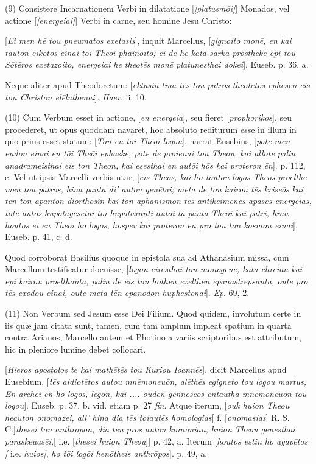 (9)
Consistere Incarnationem Verbi in dilatatione [\emph{[platusm\={o}i]}]
Monados, vel actione [\emph{[energeiai]}] Verbi in carne, seu homine
Jesu Christo:

[\emph{Ei
men h\={e} tou pneumatos exetasis}], inquit Marcellus, [\emph{gignoito
mon\={e}, en kai tauton eikot\={o}s einai t\={o}i The\={o}i
phainoito; ei de h\={e} kata sarka prosth\={e}k\={e} epi tou
S\={o}t\={e}ros exetazoito, energeiai he theot\={e}s mon\={e}
platunesthai dokei}]. Euseb. p. 36, a.

Neque
aliter apud Theodoretum: [\emph{ektasin tina t\={e}s tou patros theot\={e}tos
eph\={e}sen eis ton Christon el\={e}luthenai}]. \emph{Haer}.
ii. 10.

(10)
Cum Verbum esset in actione, [\emph{en energeia}], seu fieret [\emph{prophorikos}],
seu procederet, ut opus quoddam navaret, hoc absoluto rediturum esse
in illum in quo prius esset statum: [\emph{Ton en t\={o}i The\={o}i
logon}], narrat Eusebius, [\emph{pote men endon einai en t\={o}i
The\={o}i ephaske, pote de proienai tou Theou, kai allote palin
anadrameisthai eis ton Theon, kai esesthai en aut\={o}i h\={o}s kai
proteron \={e}n}]. p. 112, c. Vel ut ipsis Marcelli verbis utar,
[\emph{eis Theos, kai ho toutou logos Theos pro\={e}lthe men tou
patros, hina panta di' autou gen\={e}tai; meta de ton kairon t\={e}s
krise\={o}s kai t\={e}n t\={o}n apant\={o}n diorth\={o}sin
kai ton aphanismon t\={e}s antikeimen\={e}s apas\={e}s
energeias, tote autos hupotag\={e}setai t\={o}i hupotaxanti aut\={o}i
ta panta The\={o}i kai patri, hina hout\={o}s \={e}i en The\={o}i
ho logos, h\={o}sper kai proteron \={e}n pro tou ton kosmon
einai}]. Euseb. p. 41, c. d.

Quod
corroborat Basilius quoque in epistola sua ad Athanasium missa, cum
Marcellum testificatur docuisse, [\emph{logon eir\={e}sthai ton
monogen\={e}, kata chreian kai epi kairou proelthonta, palin de eis
ton hothen ex\={e}lthen epanastrepsanta, oute pro t\={e}s exodou
einai, oute meta t\={e}n epanodon huphestenai}]. \emph{Ep}. 69,
2.

(11)
Non Verbum sed Jesum esse Dei Filium. Quod quidem, involutum certe in
iis quæ jam citata sunt, tamen, cum tam amplum impleat spatium in
quarta contra Arianos, Marcello autem et Photino a variis scriptoribus
est attributum, hic in pleniore lumine debet collocari.

[\emph{Hieros
apostolos te kai math\={e}t\={e}s tou Kuriou Ioann\={e}s}],
dicit Marcellus apud Eusebium, [\emph{t\={e}s aidiot\={e}tos autou
mn\={e}moneu\={o}n, al\={e}th\={e}s egigneto tou logou
martus, En arch\={e}i \={e}n ho logos, leg\={o}n, kai ....
ouden genn\={e}se\={o}s entautha mn\={e}moneu\={o}n tou
logou}]. Euseb. p. 37, b. vid. etiam p. 27 \emph{fin}. Atque iterum,
[\emph{ouk huion Theou heauton onomazei, all' hina dia t\={e}s
toiaut\={e}s homologias}[ f. [\emph{onomasias}] R. S. C.]\emph{thesei ton anthr\={o}pon, dia t\={e}n pros auton koin\={o}nian,
huion Theou genesthai paraskeuas\={e}i,}[ i.e. [\emph{thesei huion
Theou}]] p. 42, a. Iterum [\emph{houtos estin ho agap\={e}tos [}
i.e. \emph{huios]}, \emph{ho t\={o}i log\={o}i hen\={o}theis
anthr\={o}pos}]. p. 49, a.

